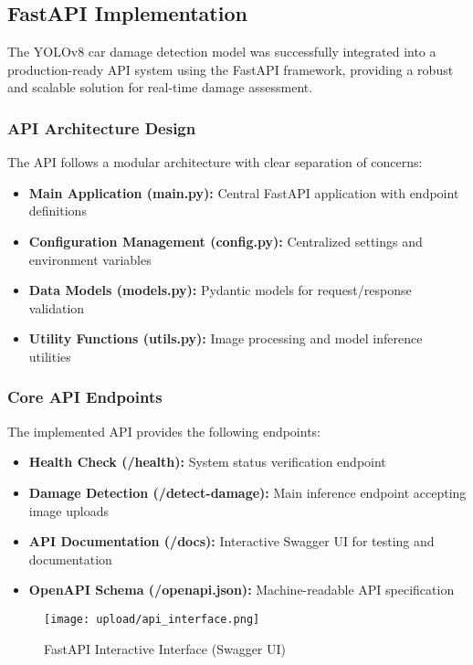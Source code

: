 \documentclass[12pt,a4paper]{report}
\begin{document}
\subsection{FastAPI Implementation}

The YOLOv8 car damage detection model was successfully integrated into a production-ready API system using the FastAPI framework, providing a robust and scalable solution for real-time damage assessment.

\subsubsection{API Architecture Design}

The API follows a modular architecture with clear separation of concerns:

\begin{itemize}
    \item \textbf{Main Application (main.py):} Central FastAPI application with endpoint definitions
    \item \textbf{Configuration Management (config.py):} Centralized settings and environment variables
    \item \textbf{Data Models (models.py):} Pydantic models for request/response validation
    \item \textbf{Utility Functions (utils.py):} Image processing and model inference utilities
\end{itemize}



\subsubsection{Core API Endpoints}

The implemented API provides the following endpoints:

\begin{itemize}
    \item \textbf{Health Check (/health):} System status verification endpoint
    \item \textbf{Damage Detection (/detect-damage):} Main inference endpoint accepting image uploads
    \item \textbf{API Documentation (/docs):} Interactive Swagger UI for testing and documentation
    \item \textbf{OpenAPI Schema (/openapi.json):} Machine-readable API specification
\end{itemize}

\begin{figure}[H]
    \centering
    \texttt{[image: upload/api\_interface.png]}
    \caption{FastAPI Interactive Interface (Swagger UI)}
    \label{fig:api_interface}
\end{figure}
\end{document}
